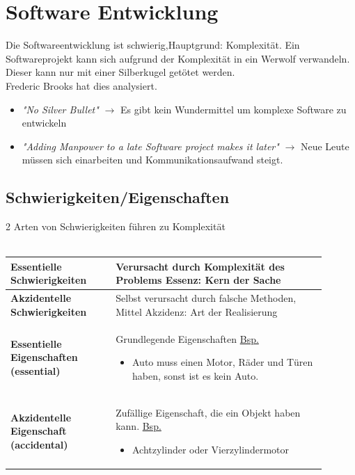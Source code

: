 \section{Software Entwicklung}
\begin{figure}
\end{figure}
Die Softwareentwicklung ist schwierig,Hauptgrund: Komplexität.  
Ein Softwareprojekt kann sich aufgrund der Komplexität in ein Werwolf verwandeln. Dieser kann nur mit einer Silberkugel getötet werden.\\
Frederic Brooks hat dies analysiert. \\

\begin{itemize}
	\item \textit{"No Silver Bullet"} $\rightarrow$ Es gibt kein Wundermittel um komplexe Software zu entwickeln
	\item \textit{"{}Adding Manpower to a late Software project makes it later"} $\rightarrow$ Neue Leute müssen sich einarbeiten und Kommunikationsaufwand steigt. 
\end{itemize}

\subsection{Schwierigkeiten/Eigenschaften}
2 Arten von Schwierigkeiten führen zu Komplexität\\ \\
\begin{tabular}{|p{0.3\linewidth}|p{0.6\linewidth}|}
	\hline
	\textbf{Essentielle Schwierigkeiten} & Verursacht durch Komplexität des Problems \newline Essenz: Kern der Sache \\ \hline
	\textbf{Akzidentelle Schwierigkeiten} & Selbst verursacht durch falsche Methoden, Mittel \newline Akzidenz: Art der Realisierung \\ \hline\hline
	\textbf{Essentielle Eigenschaften (essential)} & Grundlegende Eigenschaften \newline \underline{Bsp.} 
	\begin{itemize}
	\item Auto muss einen Motor, Räder und Türen haben, sonst ist es kein Auto.
	\end{itemize} \\ \hline
	\textbf{Akzidentelle Eigenschaft (accidental)} & Zufällige Eigenschaft, die ein Objekt haben kann. \newline \underline{Bsp.} 
	\begin{itemize}
	\item Achtzylinder oder Vierzylindermotor
	\end{itemize} \\ \hline
\end{tabular}
